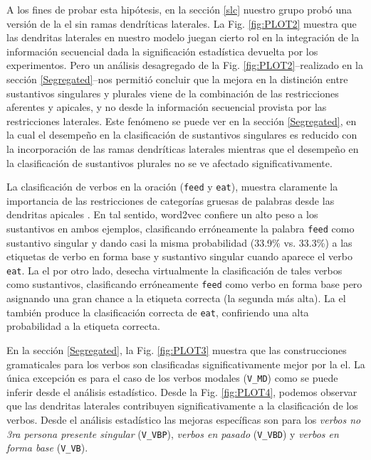 A los fines de probar esta hipótesis, en la sección \ref{slc} nuestro grupo probó una versión de la \gls{el} sin ramas dendríticas laterales.
La Fig. \ref{fig:PLOT2} muestra que las dendritas laterales en nuestro modelo juegan cierto rol en la integración de la información secuencial
dada la significación estadística devuelta por los experimentos.
Pero un análisis desagregado de la Fig. \ref{fig:PLOT2}--realizado en la sección \ref{Segregated}--nos permitió concluir que la mejora en la distinción entre sustantivos singulares y plurales viene de la combinación de las restricciones aferentes y apicales, y no desde la información secuencial provista por las restricciones laterales.
Este fenómeno se puede ver en la sección \ref{Segregated}, en la cual el desempeño en la clasificación de sustantivos singulares es reducido con la incorporación de las ramas dendríticas laterales mientras que el desempeño en la clasificación de sustantivos plurales no se ve afectado significativamente.

La clasificación de verbos en la oración (\texttt{feed} y \texttt{eat}), muestra claramente la importancia de las restricciones de categorías gruesas de palabras desde las dendritas apicales \cite{shi_newborn_1999,shi_morgan_allopenna_1998,Shi1995PerceptualCO,lohmann_phonological_2017,doi:10.1207/s15327078in1002_5}.
En tal sentido, word2vec confiere un alto peso a los sustantivos en ambos ejemplos, clasificando erróneamente la palabra \texttt{feed} como sustantivo singular y dando casi la misma probabilidad (33.9\% vs. 33.3\%) a las etiquetas de verbo en forma base y sustantivo singular cuando aparece el verbo \texttt{eat}.
La \gls{el} por otro lado, desecha virtualmente la clasificación de tales verbos como sustantivos, clasificando erróneamente \texttt{feed} como verbo en forma base pero asignando una gran chance a la etiqueta correcta (la segunda más alta).
La \gls{el} también produce la clasificación correcta de \texttt{eat}, confiriendo una alta probabilidad a la etiqueta correcta.

En la sección \ref{Segregated}, la Fig. \ref{fig:PLOT3} muestra que las construcciones gramaticales para los verbos son clasificadas significativamente mejor por la \gls{el}.
La única excepción es para el caso de los verbos modales (\texttt{V\_MD}) como se puede inferir desde el análisis estadístico.
Desde la Fig. \ref{fig:PLOT4}, podemos observar que las dendritas laterales contribuyen significativamente a la clasificación de los verbos.
Desde el análisis estadístico las mejoras específicas son para los \emph{verbos no 3ra persona presente singular} (\texttt{V\_VBP}), \emph{verbos en pasado} (\texttt{V\_VBD}) y \emph{verbos en forma base} (\texttt{V\_VB}).

